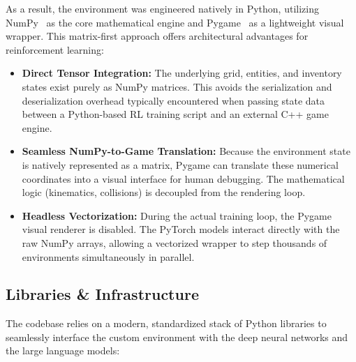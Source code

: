 As a result, the environment was engineered natively in Python, utilizing NumPy~\parencite{numpy} as the core mathematical engine and Pygame~\parencite{pygame} as a lightweight visual wrapper. This matrix-first approach offers architectural advantages for reinforcement learning:
\begin{itemize}
    \item \textbf{Direct Tensor Integration:} The underlying grid, entities, and inventory states exist purely as NumPy matrices. This avoids the serialization and deserialization overhead typically encountered when passing state data between a Python-based RL training script and an external C++ game engine.
    \item \textbf{Seamless NumPy-to-Game Translation:} Because the environment state is natively represented as a matrix, Pygame can translate these numerical coordinates into a visual interface for human debugging. The mathematical logic (kinematics, collisions) is decoupled from the rendering loop.
    \item \textbf{Headless Vectorization:} During the actual training loop, the Pygame visual renderer is disabled. The PyTorch models interact directly with the raw NumPy arrays, allowing a vectorized wrapper to step thousands of environments simultaneously in parallel.
\end{itemize}

\subsection{Libraries \& Infrastructure}
\label{sec:env_libs}

The codebase relies on a modern, standardized stack of Python libraries to seamlessly interface the custom environment with the deep neural networks and the large language models:

